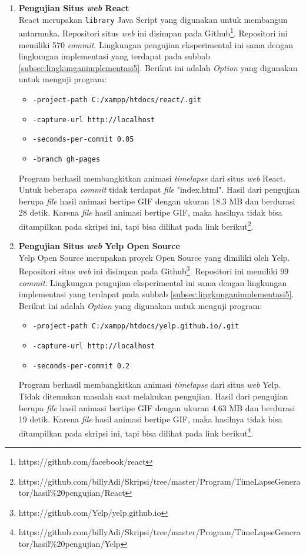 \begin{enumerate}
\item \textbf{Pengujian Situs \textit{web} React}\\
React merupakan \texttt{library} Java Script yang digunakan untuk membangun antarmuka. Repositori situs \textit{web} ini disimpan pada Github\footnote{https://github.com/facebook/react}. Repositori ini memiliki 570 \textit{commit}. Lingkungan pengujian eksperimental ini sama dengan lingkungan implementasi yang terdapat pada subbab \ref{subsec:lingkunganimplementasi5}. Berikut ini adalah \textit{Option} yang digunakan untuk menguji program:
\begin{itemize}
\item \texttt{-project-path C:/xampp/htdocs/react/.git}
\item \texttt{-capture-url http://localhost}
\item \texttt{-seconds-per-commit 0.05}
\item \texttt{-branch gh-pages} 
\end{itemize}
Program berhasil membangkitkan animasi \textit{timelapse} dari situs \textit{web} React. Untuk beberapa \textit{commit} tidak terdapat \textit{file} "index.html". Hasil dari pengujian berupa \textit{file} hasil animasi bertipe GIF dengan ukuran 18.3 MB dan berdurasi 28 detik. Karena \textit{file} hasil animasi bertipe GIF, maka hasilnya tidak bisa ditampilkan pada skripsi ini, tapi bisa dilihat pada link berikut\footnote{https://github.com/billyAdi/Skripsi/tree/master/Program/TimeLapseGenerator/hasil\%20pengujian/React}.

\item \textbf{Pengujian Situs \textit{web} Yelp Open Source}\\
Yelp Open Source merupakan proyek Open Source yang dimiliki oleh Yelp. Repositori situs \textit{web} ini disimpan pada Github\footnote{https://github.com/Yelp/yelp.github.io}. Repositori ini memiliki 99 \textit{commit}. Lingkungan pengujian eksperimental ini sama dengan lingkungan implementasi yang terdapat pada subbab \ref{subsec:lingkunganimplementasi5}. Berikut ini adalah \textit{Option} yang digunakan untuk menguji program:
\begin{itemize}
\item \texttt{-project-path C:/xampp/htdocs/yelp.github.io/.git}
\item \texttt{-capture-url http://localhost}
\item \texttt{-seconds-per-commit 0.2} 
\end{itemize}
Program berhasil membangkitkan animasi \textit{timelapse} dari situs \textit{web} Yelp. Tidak ditemukan masalah saat melakukan pengujian. Hasil dari pengujian berupa \textit{file} hasil animasi bertipe GIF dengan ukuran 4.63 MB dan berdurasi 19 detik. Karena \textit{file} hasil animasi bertipe GIF, maka hasilnya tidak bisa ditampilkan pada skripsi ini, tapi bisa dilihat pada link berikut\footnote{https://github.com/billyAdi/Skripsi/tree/master/Program/TimeLapseGenerator/hasil\%20pengujian/Yelp}.

\end{enumerate}